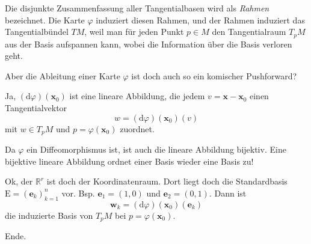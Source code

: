 \documentclass{beamer}
\newcommand{\R}{\mathbb R}
\begin{document}
\begin{frame}
Die disjunkte Zusammenfassung aller Tangentialbasen wird als
\emph{Rahmen} bezeichnet. Die Karte $\varphi$ induziert diesen
Rahmen, und der Rahmen induziert das Tangentialbündel $TM$, weil
man für jeden Punkt $p\in M$ den Tangentialraum $T_pM$ aus der Basis
aufspannen kann, wobei die Information über die Basis verloren geht.
\end{frame}

\begin{frame}
Aber die Ableitung einer Karte $\varphi$ ist doch auch so ein
komischer Pushforward?
\end{frame}

\begin{frame}
Ja, $(\mathrm d\varphi)(\mathbf x_0)$ ist eine lineare Abbildung,
die jedem $v=\mathbf x-\mathbf x_0$ einen Tangentialvektor
\[w = (\mathrm d\varphi)(\mathbf x_0)(v)\]
mit $w\in T_pM$ und $p=\varphi(\mathbf x_0)$ zuordnet.
\end{frame}

\begin{frame}
Da $\varphi$ ein Diffeomorphismus ist, ist auch die lineare Abbildung
bijektiv. Eine bijektive lineare Abbildung ordnet einer Basis
wieder eine Basis zu!
\end{frame}

\begin{frame}
Ok, der $\R^r$ ist doch der Koordinatenraum. Dort liegt doch die
Standardbasis $\mathrm E=(\mathbf e_k)_{k=1}^n$ vor. Bsp.
$\mathbf e_1=(1,0)$ und $\mathbf e_2=(0,1)$. Dann ist
\[\mathbf w_k = (\mathrm d\varphi)(\mathbf x_0)(\mathbf e_k)\]
die induzierte Basis von $T_pM$ bei $p=\varphi(\mathbf x_0)$.
\end{frame}

\begin{frame}
Ende.
\end{frame}
\end{document}
